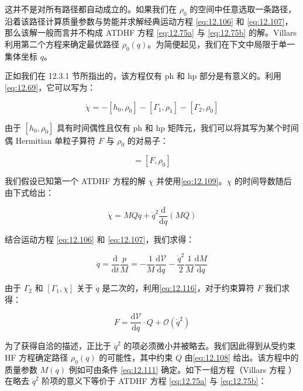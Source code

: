 这并不是对所有路径都自动成立的。如果我们在 $\rho_{0}$ 的空间中任意选取一条路径，沿着该路径计算质量参数与势能并求解经典运动方程
\ref{eq:12.106} 和 \ref{eq:12.107}，那么该解一般而言并不构成 ATDHF 方程 \ref{eq:12.75a}
与 \ref{eq:12.75b} 的解。Villars \cite{Vi75,Vi77} 利用第二个方程来确定最优路径 $\rho_{0}(q)$。为简便起见，我们在下文中局限于单一集体坐标
$q$。

正如我们在 12.3.1 节所指出的，该方程仅有 ph 和 hp 部分是有意义的。利用\ref{eq:12.69}，它可以写为：

\begin{equation}
\dot{\chi}=-[h_{0},\rho_{0}]-[\Gamma_{1},\rho_{1}]-[\Gamma_{2},\rho_{0}]\label{eq:12.115}
\end{equation}

由于 $[h_{0},\rho_{0}]$ 具有时间偶性且仅有 ph 和 hp 矩阵元，我们可以将其写为某个时间偶 Hermitian
单粒子算符 $F$ 与 $\rho_{0}$ 的对易子：

\begin{equation}
[h_{0},\rho_{0}]=[F,\rho_{0}]\label{eq:12.116}
\end{equation}

我们假设已知第一个 ATDHF 方程的解 $\chi$ 并使用\ref{eq:12.109}。$\chi$ 的时间导数随后由下式给出：

\begin{equation}
\dot{\chi}=MQ\ddot{q}+\dot{q}^{2}\frac{\mathrm{d}}{\mathrm{d}q}(MQ)\label{eq:12.117}
\end{equation}

结合运动方程 \ref{eq:12.106} 和 \ref{eq:12.107}，我们求得：

\begin{equation}
\ddot{q}=\frac{\mathrm{d}}{\mathrm{d}t}\frac{p}{M}=-\frac{1}{M}\frac{\mathrm{d}\mathcal{V}}{\mathrm{d}q}-\frac{\dot{q}^{2}}{2}\frac{1}{M}\frac{\mathrm{d}M}{\mathrm{d}q}\label{eq:12.118}
\end{equation}

由于 $\Gamma_{2}$ 和 $[\Gamma_{1},\chi]$ 关于 $\dot{q}$ 是二次的，利用\ref{eq:12.116}，对于约束算符
$F$ 我们求得：

\begin{equation}
F=\frac{\mathrm{d}\mathcal{V}}{\mathrm{d}q}\cdot Q+\mathcal{O}(\dot{q}^{2})\label{eq:12.119}
\end{equation}

为了获得自洽的描述，正比于 $\dot{q}^{2}$ 的项必须微小并被略去。我们因此得到从受约束 HF 方程确定路径 $\rho_{0}(q)$
的可能性，其中约束 $Q$ 由\ref{eq:12.108} 给出。该方程中的质量参数 $M(q)$ 例如可由条件 \ref{eq:12.111}
确定。如下一组方程（Villars 方程 \cite{Vi75,Vi77}）在略去 $\dot{q}^{2}$ 阶项的意义下等价于
ATDHF 方程 \ref{eq:12.75a} 与 \ref{eq:12.75b}：

